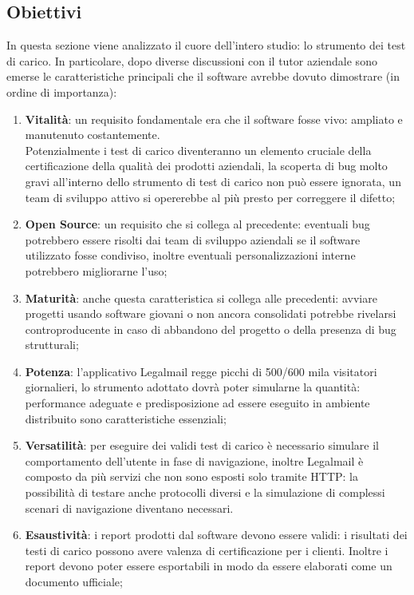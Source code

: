 \subsection{Obiettivi}
In questa sezione viene analizzato il cuore dell'intero studio: lo strumento dei test di carico. In particolare, dopo diverse discussioni con il tutor aziendale sono emerse le caratteristiche principali che il software avrebbe dovuto dimostrare (in ordine di importanza):
\begin{enumerate}
	\item \textbf{Vitalità}: un requisito fondamentale era che il software fosse vivo: ampliato e manutenuto costantemente.\\ Potenzialmente i test di carico diventeranno un elemento cruciale della certificazione della qualità dei prodotti aziendali, la scoperta di bug molto gravi all'interno dello strumento di test di carico non può essere ignorata, un team di sviluppo attivo si opererebbe al più presto per correggere il difetto;
	\item \textbf{Open Source}: un requisito che si collega al precedente: eventuali bug potrebbero essere risolti dai team di sviluppo aziendali se il software utilizzato fosse condiviso, inoltre eventuali personalizzazioni interne potrebbero migliorarne l'uso;
	\item \textbf{Maturità}: anche questa caratteristica si collega alle precedenti: avviare progetti usando software giovani o non ancora consolidati potrebbe rivelarsi controproducente in caso di abbandono del progetto o della presenza di bug strutturali;
	\item \textbf{Potenza}: l'applicativo Legalmail regge picchi di 500/600 mila visitatori giornalieri, lo strumento adottato dovrà poter simularne la quantità: performance adeguate e predisposizione ad essere eseguito in ambiente distribuito sono caratteristiche essenziali;
	\item \textbf{Versatilità}: per eseguire dei validi test di carico è necessario simulare il comportamento dell'utente in fase di navigazione, inoltre Legalmail è composto da più servizi che non sono esposti solo tramite HTTP: la possibilità di testare anche protocolli diversi e la simulazione di complessi scenari di navigazione diventano necessari.
	\item \textbf{Esaustività}: i report prodotti dal software devono essere validi: i risultati dei testi di carico possono avere valenza di certificazione per i clienti. Inoltre i report devono poter essere esportabili in modo da essere elaborati come un documento ufficiale;

\end{enumerate}

